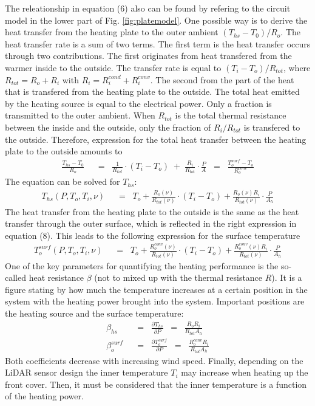 The releationship in equation (6) also can be found by refering to the circuit model in the lower part of Fig. \ref{fig:platemodel}. One possible way is to derive the heat transfer from the heating plate to the outer ambient \((T_{hs}-T_0)/R_o\). The heat transfer rate is a sum of two terms. The first term is the heat transfer occurs through two contributions. The first originates from heat transfered from the warmer inside to the outside. The transfer rate is equal to \((T_i - T_o)/R_{tot}\), where \(R_{tot} = R_o + R_i\) with \(R_i = R_i^{cond} + R_i^{conv}\). The second from the part of the heat that is transfered from the heating plate to the outside. The total heat emitted by the heating source is equal to the electrical power. Only a fraction is transmitted to the outer ambient. When \(R_{tot}\) is the total thermal resistance between the inside and the outside, only the fraction of \(R_i/R_{tot}\) is transfered to the outside. Therefore, expression for the total heat transfer between the heating plate to the outside amounts to
\begin{align}
\frac{T_{hs}-T_0}{R_o} \;\; &= \;\; \frac{1}{R_{tot}}\cdot (T_i - T_o)\; + \;\frac{R_i}{R_{tot}}\cdot \frac{P}{A}  \;\; = \;\; \frac{T_o^{surf}-T_o}{R_o^{conv}}
\end{align}
The equation can be solved for \(T_{hs}\):
\begin{align}
T_{hs}(P,T_o,T_i,\nu) \;\; &= \;\; T_o + \frac{R_o(\nu)}{R_{tot}(\nu)}\cdot (T_i - T_o) + \frac{R_o(\nu)R_i}{R_{tot}(\nu)}\cdot \frac{P}{A_h}
\end{align}
The heat transfer from the heating plate to the outside is the same as the heat transfer through the outer surface, which is reflected in the right expression in equation (8). This leads to the following expression for the surface temperature
\begin{align}
T_o^{surf}(P,T_o,T_i,\nu) \;\; &= \;\; T_o + \frac{R_o^{conv}(\nu)}{R_{tot}(\nu)}\cdot (T_i - T_o) + \frac{R_o^{conv}(\nu)R_i}{R_{tot}(\nu)}\cdot \frac{P}{A_h}
\end{align}
One of the key parameters for quantifying the heating performance is the so-called heat resistance \(\beta\) (not to mixed up with the thermal resistance \(R\)). It is a figure stating by how much the temperature increases at a certain position in the system with the heating power brought into the system. Important positions are the heating source and the surface temperature:
\begin{align}
\beta_{hs} \;\; &= \;\; \frac{\partial T_{hs}}{\partial P} \;\; = \;\; \frac{R_oR_i}{R_{tot}A_h} \\
\beta_o^{surf} \;\; &= \;\; \frac{\partial T_o^{surf}}{\partial P} \;\; = \;\; \frac{R_o^{conv}R_i}{R_{tot}A_h}
\end{align}
Both coefficients decrease with increasing wind speed. Finally, depending on the LiDAR sensor design the inner temperature \(T_i\) may increase when heating up the front cover. Then, it must be considered that the inner temperature is a function of the heating power. 

